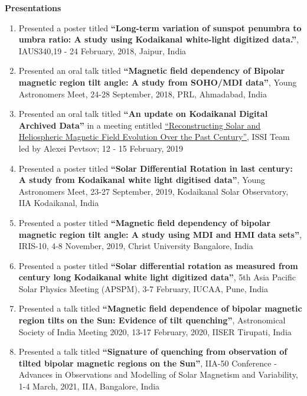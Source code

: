 \begin{center}{\huge\bf Presentations}\end{center}
\begin{enumerate}

    \item Presented a poster titled {\bf ``Long-term variation of sunspot penumbra to umbra ratio: A study using Kodaikanal white-light digitized data.''}, IAUS340,19 - 24 February, 2018, Jaipur, India
    
    \item Presented an oral talk titled {\bf ``Magnetic field dependency of Bipolar magnetic region tilt angle: A study from SOHO/MDI data''}, Young Astronomers Meet, 24-28 September, 2018, PRL, Ahmadabad, India
    
    \item Presented an oral talk titled {\bf ``An update on Kodaikanal Digital Archived Data''} in a meeting entitled \href{http://www.issibern.ch/teams/solheliomagnet/}{``Reconstructing Solar and Heliospheric Magnetic Field Evolution Over the Past Century''}, ISSI Team led by Alexei Pevtsov; 12 - 15 February, 2019
    
    \item Presented a poster titled {\bf ``Solar Differential Rotation in last century: A study from Kodaikanal white light digitised data''}, Young Astronomers Meet, 23-27 September, 2019, Kodaikanal Solar Observatory, IIA Kodaikanal, India
    
    \item Presented a poster titled {\bf ``Magnetic field dependency of bipolar magnetic region tilt angle: A study using MDI and HMI data sets''}, IRIS-10, 4-8 November, 2019, Christ University Bangalore, India
    
    \item Presented a poster titled {\bf ``Solar differential rotation as measured from century long Kodaikanal white light digitized data''}, 5th Asia Pacific Solar Physics Meeting (APSPM), 3-7 February, IUCAA, Pune, India
    
    \item Presented a talk titled {\bf ``Magnetic field dependence of bipolar magnetic region tilts on the Sun: Evidence of tilt quenching''}, Astronomical Society of India Meeting 2020, 13-17 February, 2020, IISER Tirupati, India

    \item Presented a talk titled {\bf ``Signature of quenching from observation of tilted bipolar magnetic regions on the Sun''}, IIA-50 Conference - Advances in Observations and Modelling of Solar Magnetism and Variability, 1-4 March, 2021, IIA, Bangalore, India
    

\end{enumerate}

